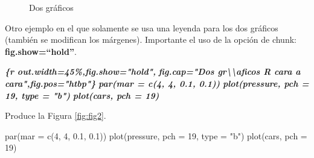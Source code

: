 \documentclass[12pt,a4paper,oneside,]{book}
\newenvironment{Shaded}{\begin{snugshade}}{\end{snugshade}}
\newcommand{\AttributeTok}[1]{\textcolor[rgb]{0.77,0.63,0.00}{#1}}
\newcommand{\DecValTok}[1]{\textcolor[rgb]{0.00,0.00,0.81}{#1}}
\newcommand{\FloatTok}[1]{\textcolor[rgb]{0.00,0.00,0.81}{#1}}
\newcommand{\FunctionTok}[1]{\textcolor[rgb]{0.00,0.00,0.00}{#1}}
\newcommand{\InformationTok}[1]{\textcolor[rgb]{0.56,0.35,0.01}{\textbf{\textit{#1}}}}
\newcommand{\NormalTok}[1]{#1}
\newcommand{\StringTok}[1]{\textcolor[rgb]{0.31,0.60,0.02}{#1}}
\numberwithin{dummy}{section}
\theoremstyle{ocrenumbox}
\theoremstyle{blacknumex}
\theoremstyle{blacknumbox}
\theoremstyle{ocrenum}
\theoremstyle{ocrenum}
\begin{document}
\begin{figure}[htbp]

{\centering {}

}

\caption{Dos gr\'aficos}\label{fig:plot-cars}
\end{figure}

Otro ejemplo en el que solamente se usa una leyenda para los dos
gráficos (también se modifican los márgenes). Importante el uso de la
opción de chunk: \textbf{fig.show=``hold''}.

\begin{Shaded}
\begin{Highlighting}[]
\InformationTok{\textasciigrave{}\textasciigrave{}\textasciigrave{}\{r out.width=\textquotesingle{}45\%\textquotesingle{},fig.show="hold",}
\InformationTok{        fig.cap="Dos gr\textbackslash{}\textbackslash{}\textquotesingle{}aficos R cara a cara",fig.pos="htbp"\}}
\InformationTok{par(mar = c(4, 4, 0.1, 0.1))}
\InformationTok{plot(pressure, pch = 19, type = "b")}
\InformationTok{plot(cars, pch = 19)}
\InformationTok{\textasciigrave{}\textasciigrave{}\textasciigrave{}}
\end{Highlighting}
\end{Shaded}

Produce la Figura \ref{fig:fig2}.

\begin{Shaded}
\begin{Highlighting}[]
\FunctionTok{par}\NormalTok{(}\AttributeTok{mar =} \FunctionTok{c}\NormalTok{(}\DecValTok{4}\NormalTok{, }\DecValTok{4}\NormalTok{, }\FloatTok{0.1}\NormalTok{, }\FloatTok{0.1}\NormalTok{))}
\FunctionTok{plot}\NormalTok{(pressure, }\AttributeTok{pch =} \DecValTok{19}\NormalTok{, }\AttributeTok{type =} \StringTok{"b"}\NormalTok{)}
\FunctionTok{plot}\NormalTok{(cars, }\AttributeTok{pch =} \DecValTok{19}\NormalTok{)}
\end{Highlighting}
\end{Shaded}
\end{document}
